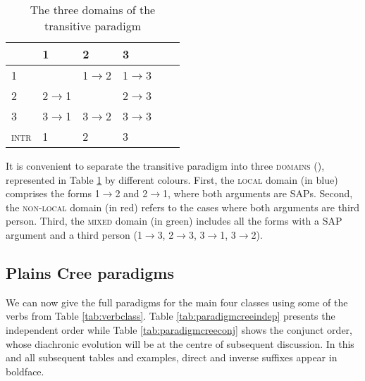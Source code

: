 \documentclass[twoside,a4paper,11pt]{article}
\newcommand{\grise}[1]{\cellcolor{lightgray}\textbf{#1}}
\begin{document}
\begin{table}[H] 
\caption{The three domains of the transitive paradigm} 
 \centering \label{tab:domain}
\begin{tabular}{l|lllll} 
\toprule
&1 & 2 &3\\
\hline
1 &\grise{} &1$\rightarrow$2\cellcolor[wave]{465} & 1$\rightarrow$3 \cellcolor[wave]{520} \\
2&2$\rightarrow$1\cellcolor[wave]{465}&\grise{}&2$\rightarrow$3 \cellcolor[wave]{520} \\
3&3$\rightarrow$1 \cellcolor[wave]{520}&3$\rightarrow$2 \cellcolor[wave]{520}&3$\rightarrow$3\cellcolor[wave]{650}\\
\hline
\textsc{intr}&1&2&3\\
\bottomrule
\end{tabular}
\end{table}
 
It is convenient to separate the transitive paradigm into three \textsc{domains} (\citealt[47-54]{zuniga06}), represented in Table  \ref{tab:domain} by different colours. First, the \textsc{local} domain (in blue) comprises the forms 1$\rightarrow$2 and 2$\rightarrow$1, where both arguments are SAPs. Second, the \textsc{non-local} domain (in red) refers to the cases where both arguments are third person. Third, the \textsc{mixed} domain (in green) includes all the forms with a SAP argument and a third person (1$\rightarrow$3, 2$\rightarrow$3, 3$\rightarrow$1, 3$\rightarrow$2). 


\subsection{Plains Cree paradigms}
\label{subsec:creeparadigm}
We can now give the full paradigms for the main four classes using some of the verbs from Table \ref{tab:verbclass}. Table \ref{tab:paradigmcreeindep} presents the independent order while Table \ref{tab:paradigmcreeconj} shows the conjunct order, whose diachronic evolution will be at the centre of subsequent discussion. In this and all subsequent tables and examples, direct and inverse suffixes appear in boldface.
\end{document}
